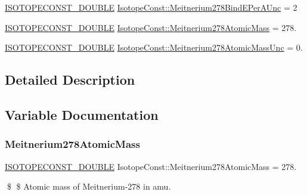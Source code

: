 \begin{DoxyCompactItemize}
\mbox{\hyperlink{group___isotope_const-_macros_ga8f45a7272ce02c0b4c65c44636ed719a}{I\+S\+O\+T\+O\+P\+E\+C\+O\+N\+S\+T\+\_\+\+D\+O\+U\+B\+LE}} \mbox{\hyperlink{group___isotope_const-_meitnerium-_mt278_gaf61ec2824f2ad4ae12f2d5b69d6b78dd}{Isotope\+Const\+::\+Meitnerium278\+Bind\+E\+Per\+A\+Unc}} = 2
\item 
\mbox{\hyperlink{group___isotope_const-_macros_ga8f45a7272ce02c0b4c65c44636ed719a}{I\+S\+O\+T\+O\+P\+E\+C\+O\+N\+S\+T\+\_\+\+D\+O\+U\+B\+LE}} \mbox{\hyperlink{group___isotope_const-_meitnerium-_mt278_gac65531a73f29344e111112f73c73ad55}{Isotope\+Const\+::\+Meitnerium278\+Atomic\+Mass}} = 278.
\item 
\mbox{\hyperlink{group___isotope_const-_macros_ga8f45a7272ce02c0b4c65c44636ed719a}{I\+S\+O\+T\+O\+P\+E\+C\+O\+N\+S\+T\+\_\+\+D\+O\+U\+B\+LE}} \mbox{\hyperlink{group___isotope_const-_meitnerium-_mt278_ga60d05a3a3277cfc7d184781e9645d5aa}{Isotope\+Const\+::\+Meitnerium278\+Atomic\+Mass\+Unc}} = 0.
\end{DoxyCompactItemize}


\subsection{Detailed Description}


\subsection{Variable Documentation}
\mbox{\label{group___isotope_const-_meitnerium-_mt278_gac65531a73f29344e111112f73c73ad55}} 
\subsubsection{\texorpdfstring{Meitnerium278\+Atomic\+Mass}{Meitnerium278AtomicMass}}
{\footnotesize\ttfamily \mbox{\hyperlink{group___isotope_const-_macros_ga8f45a7272ce02c0b4c65c44636ed719a}{I\+S\+O\+T\+O\+P\+E\+C\+O\+N\+S\+T\+\_\+\+D\+O\+U\+B\+LE}} Isotope\+Const\+::\+Meitnerium278\+Atomic\+Mass = 278.}

\$ \$ Atomic mass of Meitnerium-\/278 in amu. \mbox{\label{group___isotope_const-_meitnerium-_mt278_ga60d05a3a3277cfc7d184781e9645d5aa}} 
